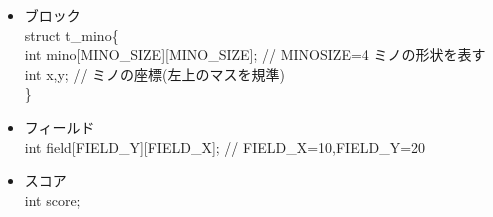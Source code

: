 \begin{itemize}
  \item ブロック\\ \mbox{}
        struct t\_mino\{\\
          int mino[MINO\_SIZE][MINO\_SIZE]; // MINOSIZE=4 ミノの形状を表す\\
          int x,y; // ミノの座標(左上のマスを規準)\\
        \}
  \item フィールド\\ \mbox{}
        int field[FIELD\_Y][FIELD\_X]; // FIELD\_X=10,FIELD\_Y=20
  \item スコア\\ \mbox{}
        int score;
\end{itemize}
